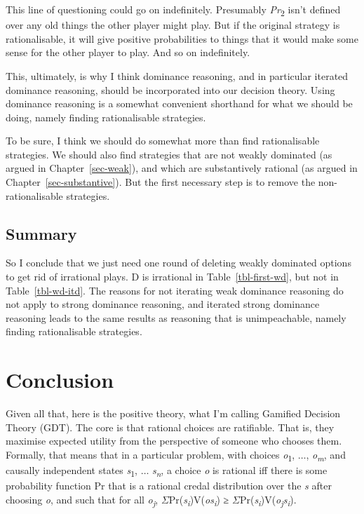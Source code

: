 \documentclass[
  12pt,
  letterpaper,
  DIV=11,
  numbers=noendperiod]{scrreprt}
\begin{document}
This line of questioning could go on indefinitely. Presumably
\emph{Pr}\textsubscript{2} isn't defined over any old things the other
player might play. But if the original strategy is rationalisable, it
will give positive probabilities to things that it would make some sense
for the other player to play. And so on indefinitely.

This, ultimately, is why I think dominance reasoning, and in particular
iterated dominance reasoning, should be incorporated into our decision
theory. Using dominance reasoning is a somewhat convenient shorthand for
what we should be doing, namely finding rationalisable strategies.

To be sure, I think we should do somewhat more than find rationalisable
strategies. We should also find strategies that are not weakly dominated
(as argued in Chapter~\ref{sec-weak}), and which are substantively
rational (as argued in Chapter~\ref{sec-substantive}). But the first
necessary step is to remove the non-rationalisable strategies.

\hypertarget{sec-weak-summary}{%
\section{Summary}\label{sec-weak-summary}}

So I conclude that we just need one round of deleting weakly dominated
options to get rid of irrational plays. D is irrational in
Table~\ref{tbl-first-wd}, but not in Table~\ref{tbl-wd-itd}. The reasons
for not iterating weak dominance reasoning do not apply to strong
dominance reasoning, and iterated strong dominance reasoning leads to
the same results as reasoning that is unimpeachable, namely finding
rationalisable strategies.


\hypertarget{sec-conclusion}{%
\chapter{Conclusion}\label{sec-conclusion}}

Given all that, here is the positive theory, what I'm calling Gamified
Decision Theory (GDT). The core is that rational choices are ratifiable.
That is, they maximise expected utility from the perspective of someone
who chooses them. Formally, that means that in a particular problem,
with choices \emph{o}\textsubscript{1}, \(\dots\),
\emph{o\textsubscript{m}}, and causally independent states
\emph{s}\textsubscript{1}, \(\dots\) \emph{s\textsubscript{n}}, a choice
\emph{o} is rational iff there is some probability function Pr that is a
rational credal distribution over the \emph{s} after choosing \emph{o},
and such that for all \emph{o\textsubscript{j}},
\(\Sigma\)Pr(\emph{s\textsubscript{i}})V(\emph{os\textsubscript{i}}) ≥
\(\Sigma\)Pr(\emph{s\textsubscript{i}})V(\emph{o\textsubscript{j}s\textsubscript{i}}).
\end{document}
